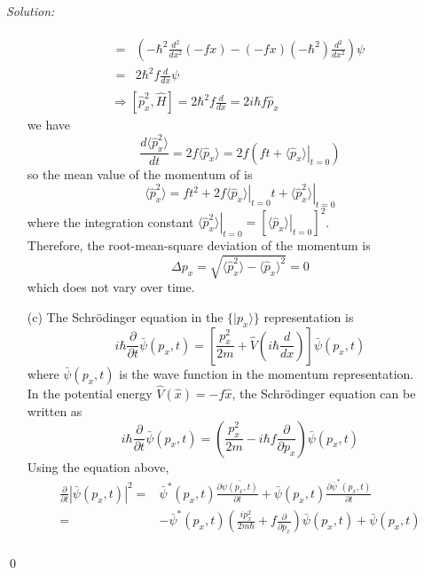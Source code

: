 \documentclass[12pt,a4paper]{article}
\newenvironment{sol}
    {\emph{Solution:}
    }
    {
    \qed
    }
\begin{document}
\begin{sol}
\begin{itemize}
\begin{gather}
\begin{align}
\nonumber=&\left(-\hbar^2\frac{d^2}{dx^2}(-fx)-(-fx)(-\hbar^2)\frac{d^2}{dx^2}\right)\psi\\
=&2\hbar^2f\frac{d}{dx}\psi
\end{align}\\
\Longrightarrow[\hat{p}_x^2,\hat{H}]=2\hbar^2f\frac{d}{dx}=2i\hbar f\hat{p}_x
\end{gather}
we have
\begin{equation}
\frac{d\langle\hat{p}_x^2\rangle}{dt}=2f\langle\hat{p}_x\rangle=2f(ft+\left.\langle\hat{p}_x\rangle\right|_{t=0})
\end{equation}
so the mean value of the momentum of is
\begin{equation}
\langle\hat{p}_x^2\rangle=ft^2+2f\left.\langle\hat{p}_x\rangle\right|_{t=0}t+\left.\langle\hat{p}_x^2\rangle\right|_{t=0}
\end{equation}
where the integration constant $\left.\langle\hat{p}_x^2\rangle\right|_{t=0}=\left[\left.\langle\hat{p}_x\rangle\right|_{t=0}\right]^2$.\\
Therefore, the root-mean-square deviation of the momentum is
\begin{equation}
\Delta p_x=\sqrt{\langle\hat{p}_x^2\rangle-\langle\hat{p}_x\rangle^2}=0
\end{equation}
which does not vary over time.
\item[(c)] The Schrödinger equation in the $\{|p_x\rangle\}$ representation is
\begin{equation}
i\hbar\frac{\partial}{\partial t}\bar{\psi}(p_x,t)=\left[\frac{p_x^2}{2m}+\hat{V}(i\hbar\frac{d}{dx})\right]\bar{\psi}(p_x,t)
\end{equation}
where $\bar{\psi}(p_x,t)$ is the wave function in the momentum representation.\\
In the potential energy $\hat{V}(\hat{x})=-f\hat{x}$, the Schrödinger equation can be written as
\begin{equation}
i\hbar\frac{\partial}{\partial t}\bar{\psi}(p_x,t)=\left(\frac{p_x^2}{2m}-i\hbar f\frac{\partial}{\partial p_x}\right)\bar{\psi}(p_x,t)
\end{equation}
Using the equation above,
\begin{align}
\nonumber\frac{\partial}{\partial t}|\bar{\psi}(p_x,t)|^2=&\bar{\psi}^*(p_x,t)\frac{\partial\bar{\psi(p_x,t)}}{\partial t}+\bar{\psi}(p_x,t)\frac{\partial\bar{\psi}^*(p_x,t)}{\partial t}\\
\nonumber=&-\bar{\psi}^*(p_x,t)\left(\frac{ip_x^2}{2m\hbar}+f\frac{\partial}{\partial p_x}\right)\bar{\psi}(p_x,t)+\bar{\psi}(p_x,t)\\

\end{align}
\end{itemize}
\end{sol}
\end{document}

